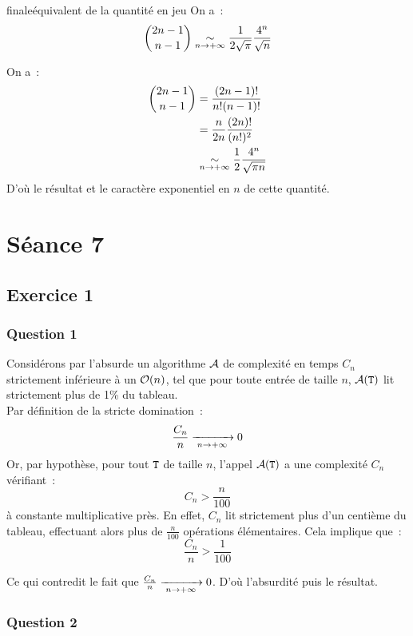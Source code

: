 \begin{proposition}{finale}{équivalent de la quantité en jeu}
    On a~:
    $$\binom{2n-1}{n-1} \underset{n \to + \infty}{\overset{{}}{\sim}} \frac{1}{2\sqrt{\pi}} \frac{4^n}{\sqrt{n}}$$
\end{proposition}

\begin{demonstration}
    On a~:
    \begin{align*}
        \binom{2n-1}{n-1} &= \frac{(2n-1)!}{n!(n-1)!}\\
        &= \frac{n}{2n} \frac{(2n)!}{(n!)^2} \\
        &\underset{n \to + \infty}{\overset{{}}{\sim}} \frac{1}{2} \frac{4^n}{\sqrt{\pi n}} \\
    \end{align*}
    D'où le résultat et le caractère exponentiel en $n$ de cette quantité.
\end{demonstration}

\section*{Séance 7}

\subsection*{Exercice 1}
\subsubsection*{Question 1}
Considérons par l'absurde un algorithme $\mathcal{A}$ de complexité en temps $C_n$ strictement inférieure à un $\mathcal{O}(n)$, tel que pour toute entrée  de taille $n$, $\mathcal{A}(\texttt{T})$ lit strictement plus de 1\% du tableau.\\
Par définition de la stricte domination~:
$$\frac{C_n}{n} \xrightarrow[\;n \to + \infty\;]{} 0$$
Or, par hypothèse, pour tout $\texttt{T}$ de taille $n$, l'appel $\mathcal{A}(\texttt{T})$ a une complexité $C_n$ vérifiant~:
$$C_n > \frac{n}{100}$$
à constante multiplicative près. En effet, $C_n$ lit strictement plus d'un centième du tableau, effectuant alors plus de $\frac{n}{100}$ opérations élémentaires. Cela implique que~:
$$\frac{C_n}{n} > \frac{1}{100}$$

Ce qui contredit le fait que $\frac{C_n}{n} \xrightarrow[\;n \to + \infty\;]{} 0$. D'où l'absurdité puis le résultat.

\subsubsection*{Question 2}

